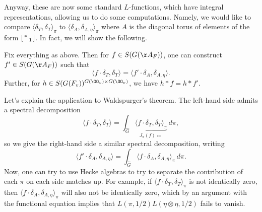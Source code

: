 \documentclass[../notes.tex]{subfiles}
\begin{document}
Anyway, these are now some standard $L$-functions, which have integral representations, allowing us to do some computations. Namely, we would like to compare $\langle\delta_T,\delta_T\rangle_\pi$ to $\langle\delta_A,\delta_{A,\eta}\rangle_\pi$ where $A$ is the diagonal torus of elements of the form $\begin{bsmallmatrix}
	* \\ & 1
\end{bsmallmatrix}$. In fact, we will show the following.
\begin{theorem}[Jacquet] \label{thm:jacquet-compare}
	Fix everything as above. Then for $f\in S(G(\AA_F))$, one can construct $f'\in S(G(\AA_F))$ such that
	\[\langle f\cdot\delta_T,\delta_T\rangle=\langle f'\cdot\delta_A,\delta_{A,\eta}\rangle.\]
	Further, for $h\in S(G(F_v))^{G(\OO_v)\times G(\OO_v)}$, we have $h*f=h*f'$.
\end{theorem}
Let's explain the application to Waldspurger's theorem. The left-hand side admits a spectral decomposition
\[\langle f\cdot\delta_T,\delta_T\rangle=\int_{\widehat G}\underbrace{\langle f\cdot\delta_T,\delta_T\rangle_\pi}_{J_\pi(f)\coloneqq}\,d\pi,\]
so we give the right-hand side a similar spectral decomposition, writing
\[\langle f'\cdot\delta_A,\delta_{A,\eta}\rangle=\int_{\widehat G}\langle f\cdot\delta_A,\delta_{A,\eta}\rangle_\pi\,d\pi.\]
Now, one can try to use Hecke algebras to try to separate the contribution of each $\pi$ on each side matches up. For example, if $\langle f\cdot\delta_T,\delta_T\rangle_\pi$ is not identically zero, then $\langle f\cdot\delta_A,\delta_{A,\eta}\rangle_\pi$ will also not be identically zero, which by an argument with the functional equation implies that $L(\pi,1/2)L(\eta\otimes\eta,1/2)$ fails to vanish.
\end{document}
